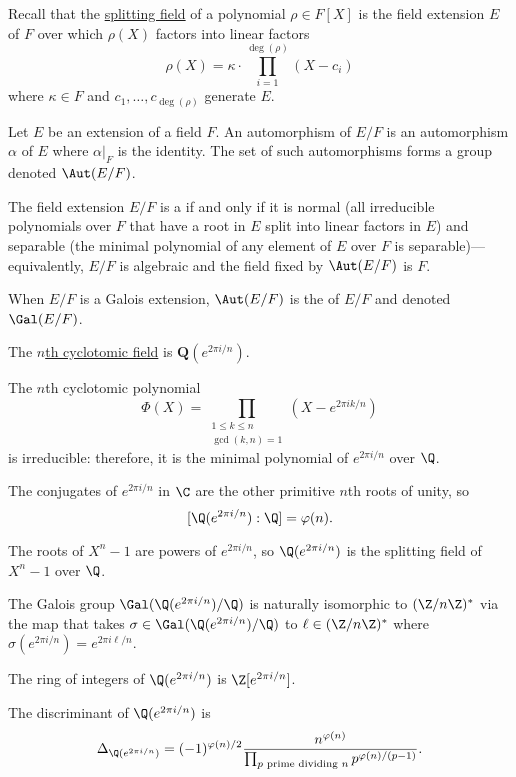 \documentclass [preview, border = 20pt] {standalone}
\begin{document}
\pagecolor{black}
\color{white}

\setlength{\parskip}{1 em}

Recall that the \ul{splitting field} of a polynomial $\rho\in F[X]$ is the field extension $E$ of $F$ over which $\rho(X)$ factors into linear factors
\[
  \rho(X) = \kappa\cdot \prod_{i=1}^{\deg(\rho)}(X-c_i)
\]
where $\kappa\in F$ and $c_1,\hdots, c_{\deg(\rho)}$ generate $E$.

Let $E$ be an extension of a field $F$. An automorphism of $E/F$ is an automorphism $\alpha$ of $E$ where $\alpha|_F$ is the identity. The set of such automorphisms forms a group denoted $\Aut(E/F)$. 

The field extension $E/F$ is a  if and only if it is normal (all irreducible polynomials over $F$ that have a root in $E$ split into linear factors in $E$) and separable (the minimal polynomial of any element of $E$ over $F$ is separable)---equivalently, $E/F$ is algebraic and the field fixed by $\Aut(E/F)$ is $F$.

When $E/F$ is a Galois extension, $\Aut(E/F)$ is the  of $E/F$ and denoted $\Gal(E/F)$.

The \ul{$n$th cyclotomic field} is $\mathbf{Q}(e^{2\pi i/n})$.

The $n$th cyclotomic polynomial
\[
 \Phi(X) = \prod_{\substack{1\le k\le n\\\gcd(k,n)=1}} (X - e^{2\pi i k/n})
\]
is irreducible: therefore, it is the minimal polynomial of $e^{2\pi i/n}$ over $\Q$.

The conjugates of $e^{2\pi i/n}$ in $\C$ are the other primitive $n$th roots of unity, so
\[
  [\Q(e^{2\pi i/n}):\Q] = \varphi(n).
\]

The roots of $X^n -1$ are powers of $e^{2\pi i/n}$, so $\Q(e^{2\pi i/n})$ is the splitting field of $X^n -1$ over $\Q$.

The Galois group $\Gal(\Q(e^{2\pi i/n})/\Q)$ is naturally isomorphic to $(\Z/n\Z)^*$ via the map that takes $\sigma\in \Gal(\Q(e^{2\pi i/n})/\Q)$ to $\ell\in (\Z/n\Z)^*$ where $\sigma(e^{2\pi i/n}) = e^{2\pi i \ell/n}$.

The ring of integers of $\Q(e^{2\pi i/n})$ is $\Z[e^{2\pi i/n}]$.

The discriminant of $\Q(e^{2\pi i/n})$ is 
\[
\Delta_{\Q(e^{2\pi i/n})} = (-1)^{\varphi(n)/2} \frac{n^{\varphi(n)}}{\prod_{\textrm{$p$ prime dividing $n$}} p^{\varphi(n)/(p-1)}}.
\]
\end{document}
